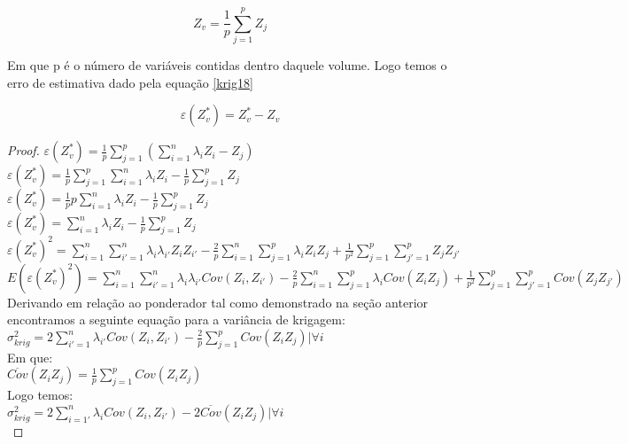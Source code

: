 \begin{equation}\label{krig17}
Z_{v}  = \frac{1}{p}\sum_{j=1}^{p} Z_{j}
\end{equation}

Em que p é o número de variáveis contidas dentro daquele volume. Logo temos o erro de estimativa dado pela equação \eqref{krig18}

\begin{equation}\label{krig18}
\varepsilon (Z^{*}_{v}) = Z^{*} _{v} - Z_{v}
\end{equation}

\begin{proof}
	$\varepsilon (Z^{*}_{v}) = \frac{1}{p}\sum_{j=1}^{p}(\sum_{i=1}^{n}\lambda_{i}Z_{i} -  Z_{j}) $ \\
	$\varepsilon (Z^{*}_{v}) = \frac{1}{p}\sum_{j=1}^{p}\sum_{i=1}^{n}\lambda_{i}Z_{i} - \frac{1}{p}\sum_{j=1}^{p} Z_{j} $ \\
	$\varepsilon (Z^{*}_{v}) = \frac{1}{p}p\sum_{i=1}^{n}\lambda_{i}Z_{i} - \frac{1}{p}\sum_{j=1}^{p} Z_{j} $\\	
	$\varepsilon (Z^{*}_{v}) = \sum_{i=1}^{n}\lambda_{i}Z_{i} - \frac{1}{p}\sum_{j=1}^{p} Z_{j} $\\	
	$\varepsilon (Z^{*}_{v})^2 = \sum_{i=1}^{n}\sum_{i'=1}^{n}\lambda_{i}\lambda_{i'}Z_{i}Z_{i'} - \frac{2}{p}\sum_{i=1}^{n}\sum_{j=1}^{p}\lambda_{i}Z_{i}Z_{j}+ \frac{1}{p^2}\sum_{j=1}^{p}\sum_{j'=1}^{p} Z_{j}Z_{j'} $\\
	$E\left(\varepsilon (Z^{*}_{v})^2 \right) = \sum_{i=1}^{n}\sum_{i'=1}^{n}\lambda_{i}\lambda_{i'}Cov(Z_{i},Z_{i'}) - \frac{2}{p}\sum_{i=1}^{n}\sum_{j=1}^{p}\lambda_{i}Cov(Z_{i}Z_{j})+ \frac{1}{p^2}\sum_{j=1}^{p}\sum_{j'=1}^{p} Cov(Z_{j}Z_{j'}) $\\   
     Derivando em relação ao ponderador tal como demonstrado na seção anterior encontramos a seguinte equação para a variância de krigagem:    \\
     $\sigma^{2}_{krig} = 2\sum_{i'=1}^{n}\lambda_{i'}Cov(Z_{i},Z_{i'}) - \frac{2}{p}\sum_{j=1}^{p}Cov(Z_{i}Z_{j}) |\forall i $\\   
     Em que: \\    
     $\overline{Cov}(Z_{i}Z_{j}) = \frac{1}{p}\sum_{j=1}^{p}Cov(Z_{i}Z_{j})$\\
     Logo temos: \\
	 $\sigma^{2}_{krig} = 2\sum_{i=1'}^{n}\lambda_{i}Cov(Z_{i},Z_{i'}) - 2\overline{Cov}(Z_{i}Z_{j}) |\forall i $\\ 
	 
	 
\end{proof}

